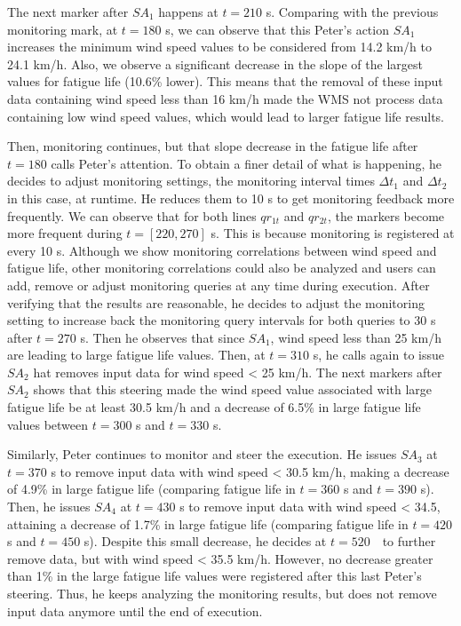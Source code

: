 The next marker after $SA_1$ happens at $t=210$ s. Comparing
with the previous monitoring mark, at $t=180$ s, we can observe
that this Peter's action $SA_1$ increases the minimum wind speed
values to be considered from 14.2 km/h to 24.1 km/h. Also, we observe a
significant decrease in the slope of the largest values for fatigue life
(10.6\% lower). This means that the removal of these input data
containing wind speed less than 16 km/h made the WMS not process data
containing low wind speed values, which would lead to larger fatigue
life results.

Then, monitoring continues, but that slope decrease in the fatigue life after $t=180$ calls Peter's
attention. To obtain a finer detail of what is happening, he decides to
adjust monitoring settings, the monitoring interval times
$\Delta t_1$ and $\Delta t_2$ in this case, at runtime. He reduces them to
10 s to get monitoring feedback more frequently. We can observe that
for both lines $qr_{1t}$ and $qr_{2t}$, the markers
become more frequent during $t = [220,270]$ s.
 This
is because monitoring is registered at every 10 s. Although we show
monitoring correlations between wind speed and fatigue life, other
monitoring correlations could also be analyzed and users can add, remove
or adjust monitoring queries at any time during execution. After
verifying that the results are reasonable, he decides to adjust the
monitoring setting to increase back the monitoring query intervals for
both queries to 30 s after $t=270$ s. Then he observes that since
$SA_1$, wind speed less than 25 km/h are leading to large fatigue
life values. Then, at $t=310$ s, he calls  again to issue
$SA_2$  hat removes input data for wind speed \textless{} 25 km/h.
The next markers after $SA_2$ shows that this steering made the wind
speed value associated with large fatigue life be at least 30.5 km/h and a
decrease of 6.5\% in large fatigue life values between $t=300$ s
and $t=330$ s.

Similarly, Peter continues to monitor and steer the execution.
He issues $SA_3$ at $t=370$ s to remove input data with wind speed
\textless{} 30.5 km/h, making a decrease of 4.9\% in large fatigue life
(comparing fatigue life in $t=360$ s and $t=390$ s).
 Then,
he issues $SA_4$ at $t=430$ s to remove input data with wind
speed \textless{} 34.5, attaining a decrease of 1.7\% in large fatigue
life (comparing fatigue life in $t=420$ s and $t=450$ s).
Despite this small decrease, he decides at $t = 520 \text{ }$ to further remove
data, but with wind speed \textless{} 35.5 km/h. However, no decrease
greater than 1\% in the large fatigue life values were registered after
this last Peter's steering. Thus, he keeps analyzing the monitoring
results, but does not remove input data anymore until the end of
execution.

